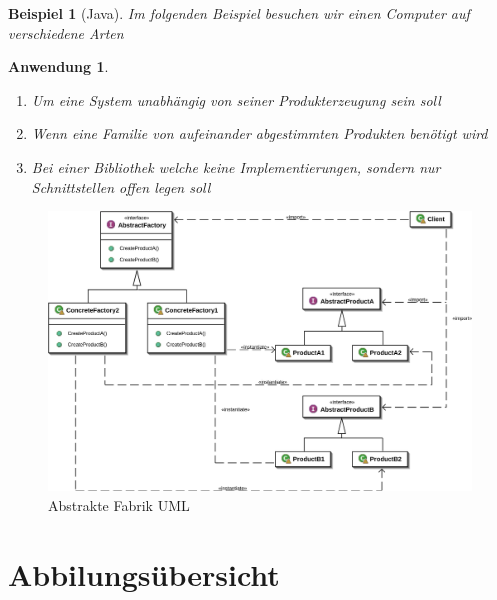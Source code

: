 \documentclass[a4paper]{article}
\theoremstyle{break}
\newtheorem{ex}{Beispiel}[section]
\newtheorem{why}{Anwendung}[section]
\begin{document}
\begin{ex}[Java]
	Im folgenden Beispiel besuchen wir einen Computer auf verschiedene Arten
	
	
	
	
	
	
	
	
	
	
	
	
\end{ex}

\begin{why}
	\begin{enumerate}
		\item Um eine System unabhängig von seiner Produkterzeugung sein soll
		\item Wenn eine Familie von aufeinander abgestimmten Produkten benötigt wird
		\item Bei einer Bibliothek welche keine Implementierungen, sondern nur Schnittstellen offen legen soll
	\end{enumerate}
	
	
\end{why}
\begin{figure}[H]
	\centering
	\includegraphics[width=\textwidth]{../uml/AbstractFactoryPattern.png}
	\caption{Abstrakte Fabrik UML}
	\label{fig3}
\end{figure}

\newpage
\appendix
\section{Abbilungsübersicht}
\listoffigures


	
\end{document}
